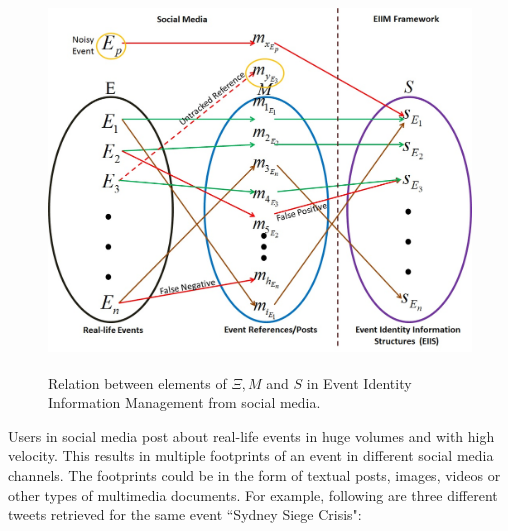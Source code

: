 %
%
%

\begin{figure}[htbp]
  \caption{Relation between elements of $\Xi,M$ and $S$ in Event Identity Information Management from social media.}
\label{eventresolutionmappings}
  \centering
    \includegraphics[width=12cm,height=10cm]{Figures/EventResolutionMappings.jpg}
\end{figure}


%
%

Users in social media post about real-life events in huge volumes and with high velocity. This results in multiple footprints of an event in different social media channels. The footprints could be in the form of textual posts, images, videos or other types of multimedia documents. For example,
following are three different tweets retrieved for the same event ``Sydney Siege Crisis":

